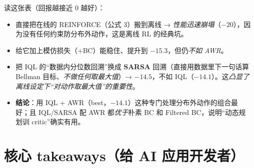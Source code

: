 \documentclass[11pt,UTF8,fontset=fandol]{ctexart}
\begin{document}
读这张表（回报越接近 0 越好）：
\begin{itemize}[leftmargin=1.5em]
\item 直接把在线的 REINFORCE（公式 3）搬到离线 → \emph{性能迅速崩塌}（$-20$），因为没有任何约束防分布外动作，这是离线 RL 的经典坑。
\item 给它加上模仿损失（+BC）能稳住、提升到 $-15.3$，但仍\emph{不如 AWR}。
\item 把 IQL 的“数据内分位数回溯”换成 \textbf{SARSA} 回溯（直接用数据里下一句话算 Bellman 目标、\emph{不做任何取最大值}）→ $-14.5$，不如 IQL（$-14.1$）。这\emph{凸显了离线设定下“对动作取最大值”的重要性}。
\item \textbf{结论}：用 IQL + AWR（best，$-14.1$）这种专门处理分布外动作的组合最好；且 IQL/SARSA 配 AWR 都\emph{优于}朴素 BC 和 Filtered BC，说明“动态规划训 critic”确实有用。
\end{itemize}

\section{核心 takeaways（给 AI 应用开发者）}
\end{document}
